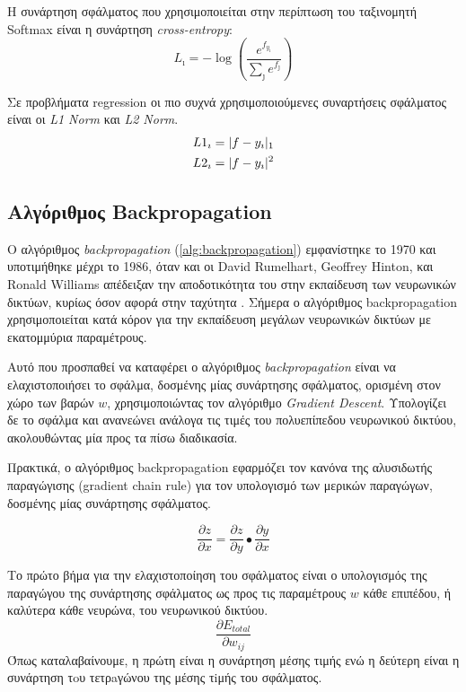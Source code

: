 Η συνάρτηση σφάλματος που χρησιμοποιείται στην περίπτωση του ταξινομητή Softmax 
είναι η συνάρτηση \emph{cross-entropy}:
\begin{equation*}
  L_{\imath} = - \log{(\frac{e^{f_{y_{\imath}}}}{\sum_{\jmath}^{} e^{f_{\jmath}}})}
\end{equation*}


Σε προβλήματα regression οι πιο συχνά χρησιμοποιούμενες συναρτήσεις
σφάλματος είναι οι \emph{L1 Norm} και \emph{L2 Norm}.
\begin{gather*}
  L1_{\imath} = \lvert f - y_{\imath}\rvert_{1} \\
  L2_{\imath} = \lvert f - y_{\imath}\rvert^{2}
\end{gather*}


\subsection{Αλγόριθμος Backpropagation}

Ο αλγόριθμος \emph{backpropagation} (\autoref{alg:backpropagation}) εμφανίστηκε το 1970 και υποτιμήθηκε
μέχρι το 1986, όταν και οι David Rumelhart, Geoffrey Hinton, και Ronald Williams
απέδειξαν την αποδοτικότητα του στην εκπαίδευση των νευρωνικών δικτύων, κυρίως
όσον αφορά στην ταχύτητα \cite{rumelhart1988learning}.
Σήμερα ο αλγόριθμος backpropagation χρησιμοποιείται κατά κόρον για την εκπαίδευση
μεγάλων νευρωνικών δικτύων με εκατομμύρια παραμέτρους.

Αυτό που προσπαθεί να καταφέρει ο αλγόριθμος \emph{backpropagation} είναι να
ελαχιστοποιήσει το σφάλμα, δοσμένης μίας συνάρτησης σφάλματος, ορισμένη στον χώρο
των βαρών $w$, χρησιμοποιώντας τον αλγόριθμο \emph{Gradient Descent}.
Υπολογίζει δε το σφάλμα και ανανεώνει ανάλογα τις τιμές του
πολυεπίπεδου νευρωνικού δικτύου, ακολουθώντας μία προς τα πίσω διαδικασία.

Πρακτικά, ο αλγόριθμος backpropagation εφαρμόζει τον κανόνα
της αλυσιδωτής παραγώγισης (gradient chain rule) για τον υπολογισμό των
μερικών παραγώγων, δοσμένης μίας συνάρτησης σφάλματος.

\begin{equation*}
  \frac{\partial z}{\partial x} = \frac{\partial z}{\partial y}\bullet\frac{\partial y}{\partial x}
\end{equation*}


Το πρώτο βήμα για την ελαχιστοποίηση του σφάλματος είναι ο υπολογισμός
της παραγώγου της συνάρτησης σφάλματος ως προς τις παραμέτρους $w$ κάθε επιπέδου,
ή καλύτερα κάθε νευρώνα, του νευρωνικού δικτύου.
\begin{equation*}
  \frac{\partial E_{total}}{\partial w_{ij}}
\end{equation*}
Όπως καταλαβαίνουμε, η πρώτη είναι η συνάρτηση μέσης τιμής ενώ η δεύτερη
είναι η συνάρτηση τoυ τετρaγώνου της μέσης τiμής του σφάλματος.

